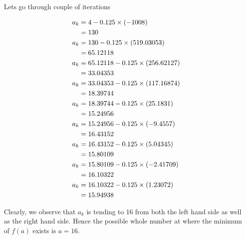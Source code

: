 \documentclass[journal,12pt,twocolumn]{IEEEtran}
\begin{document}
Lets go through couple of iterations


\begin{align}
    a_k &= 4     - 0.125\times\left(-1008\right)\\
    &= 130 \\
    a_k &= 130 - 0.125\times\left(519.03053\right)\\
    &= 65.12118 \\
    a_k &= 65.12118 - 0.125\times\left(256.62127\right) \\
    &= 33.04353\\
    a_k &= 33.04353 - 0.125\times\left(117.16874\right)\\
    &= 18.39744 \\
    a_k &= 18.39744 - 0.125\times\left(25.1831\right)\\
    &= 15.24956 \\
    a_k &= 15.24956 - 0.125\times\left(-9.4557\right)\\
    &= 16.43152 \\
    a_k &= 16.43152 - 0.125\times\left(5.04345\right)\\
    &= 15.80109 \\
    a_k &= 15.80109 - 0.125\times\left(-2.41709\right)\\
    &= 16.10322 \\
    a_k &= 16.10322 - 0.125\times\left(1.23072\right)\\
    &= 15.94938
\end{align}

Clearly, we observe that $a_k$ is tending to 16 from both the left hand side as well as the right hand side. Hence the possible whole number at where the minimum of $f(a)$ exists is $a=16$.

	    
	  
	  
	 
\end{document}
